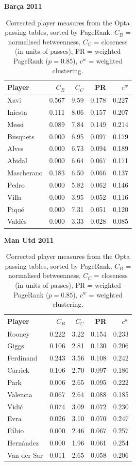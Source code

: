 \begin{table}[p]
\centering
\caption{Corrected player measures from the Opta passing tables, sorted by PageRank. $C_B$ = normalised betweenness, $C_C$ = closeness (in units of passes), PR = weighted PageRank ($p = 0.85$), $c^w$ = weighted clustering.}
\label{tab:centralities}

\begin{minipage}[t]{0.48\textwidth}\centering\footnotesize
\textbf{Barça 2011}\\[2pt]
\begin{tabular}{lrrrr}
\toprule
Player & $C_B$ & $C_C$ & PR & $c^w$ \\
\midrule
Xavi & 0.567 & 9.59 & 0.178 & 0.227 \\
Iniesta & 0.111 & 8.06 & 0.157 & 0.207 \\
Messi & 0.089 & 7.84 & 0.149 & 0.214 \\
Busquets & 0.000 & 6.95 & 0.097 & 0.179 \\
Alves & 0.000 & 6.73 & 0.094 & 0.189 \\
Abidal & 0.000 & 6.64 & 0.067 & 0.171 \\
Mascherano & 0.183 & 6.50 & 0.066 & 0.137 \\
Pedro & 0.000 & 5.82 & 0.062 & 0.146 \\
Villa & 0.000 & 3.95 & 0.052 & 0.116 \\
Piqué & 0.000 & 7.31 & 0.051 & 0.120 \\
Valdés & 0.000 & 3.33 & 0.028 & 0.085 \\
\bottomrule
\end{tabular}
\end{minipage}\hfill
\begin{minipage}[t]{0.48\textwidth}\centering\footnotesize
\textbf{Man Utd 2011}\\[2pt]
\begin{tabular}{lrrrr}
\toprule
Player & $C_B$ & $C_C$ & PR & $c^w$ \\
\midrule
Rooney & 0.222 & 3.22 & 0.154 & 0.233 \\
Giggs & 0.106 & 2.81 & 0.130 & 0.206 \\
Ferdinand & 0.243 & 3.56 & 0.108 & 0.242 \\
Carrick & 0.106 & 2.70 & 0.097 & 0.186 \\
Park & 0.006 & 2.65 & 0.095 & 0.222 \\
Valencia & 0.067 & 2.64 & 0.088 & 0.185 \\
Vidić & 0.074 & 3.09 & 0.072 & 0.230 \\
Evra & 0.026 & 3.10 & 0.070 & 0.247 \\
Fábio & 0.000 & 2.46 & 0.067 & 0.257 \\
Hernández & 0.000 & 1.96 & 0.061 & 0.254 \\
Van der Sar & 0.011 & 2.65 & 0.058 & 0.206 \\
\bottomrule
\end{tabular}
\end{minipage}


\end{table}
